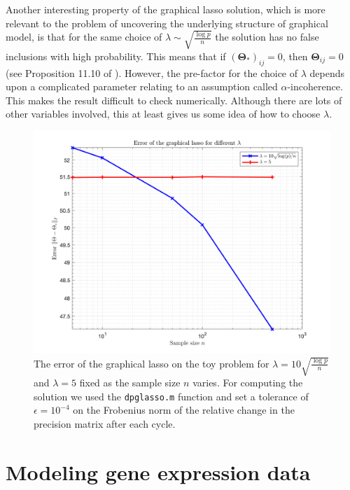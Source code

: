 \documentclass[10pt, letterpaper]{article}
\newcommand{\preci}{\boldsymbol \Theta}
\begin{document}
Another interesting property of the graphical lasso solution, which is more relevant to the problem of uncovering the underlying structure of graphical model, is that for the same choice of $\lambda \sim \sqrt{\frac{\log p}{n}}$ the solution has no false inclusions with high probability.  This means that if $(\preci_*)_{ij} = 0$, then $\preci_{ij} = 0$ (see Proposition 11.10 of \cite{Wainwright}).  However, the pre-factor for the choice of $\lambda$ depends upon a complicated parameter relating to an assumption called $\alpha$-incoherence.  This makes the result difficult to check numerically.  Although there are lots of other variables involved, this at least gives us some idea of how to choose $\lambda$.\\
 


\begin{figure}
\centering
\includegraphics[width=\textwidth]{plots/sampsize.png}
\caption{The error of the graphical lasso on the toy problem for $\lambda = 10\sqrt{\frac{\log p}{n}}$ and $\lambda = 5$ fixed as the sample size $n$ varies.  For computing the solution we used the \texttt{dpglasso.m} function and set a tolerance of $\epsilon = 10^{-4}$ on the Frobenius norm of the relative change in the precision matrix after each cycle.}
\label{fig:sampsize}
\end{figure}




\section{Modeling gene expression data}
\end{document}
